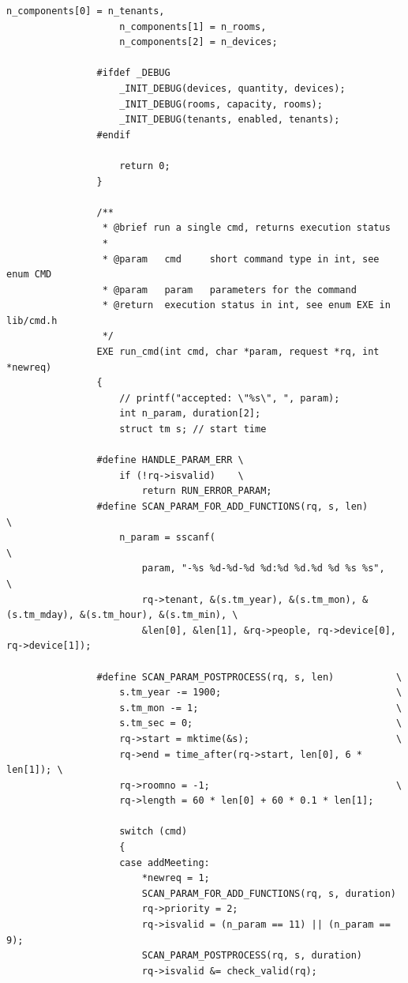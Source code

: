 \documentclass{article}
\begin{document}
\begin{Verbatim}[gobble=8]
                    n_components[0] = n_tenants,
                    n_components[1] = n_rooms,
                    n_components[2] = n_devices;
                
                #ifdef _DEBUG
                    _INIT_DEBUG(devices, quantity, devices);
                    _INIT_DEBUG(rooms, capacity, rooms);
                    _INIT_DEBUG(tenants, enabled, tenants);
                #endif
                
                    return 0;
                }
                
                /**
                 * @brief run a single cmd, returns execution status
                 * 
                 * @param   cmd     short command type in int, see enum CMD
                 * @param   param   parameters for the command
                 * @return  execution status in int, see enum EXE in lib/cmd.h
                 */
                EXE run_cmd(int cmd, char *param, request *rq, int *newreq)
                {
                    // printf("accepted: \"%s\", ", param);
                    int n_param, duration[2];
                    struct tm s; // start time
                
                #define HANDLE_PARAM_ERR \
                    if (!rq->isvalid)    \
                        return RUN_ERROR_PARAM;
                #define SCAN_PARAM_FOR_ADD_FUNCTIONS(rq, s, len)                                        \
                    n_param = sscanf(                                                                   \
                        param, "-%s %d-%d-%d %d:%d %d.%d %d %s %s",                                     \
                        rq->tenant, &(s.tm_year), &(s.tm_mon), &(s.tm_mday), &(s.tm_hour), &(s.tm_min), \
                        &len[0], &len[1], &rq->people, rq->device[0], rq->device[1]);
                
                #define SCAN_PARAM_POSTPROCESS(rq, s, len)           \
                    s.tm_year -= 1900;                               \
                    s.tm_mon -= 1;                                   \
                    s.tm_sec = 0;                                    \
                    rq->start = mktime(&s);                          \
                    rq->end = time_after(rq->start, len[0], 6 * len[1]); \
                    rq->roomno = -1;                                 \
                    rq->length = 60 * len[0] + 60 * 0.1 * len[1];
                
                    switch (cmd)
                    {
                    case addMeeting:
                        *newreq = 1;
                        SCAN_PARAM_FOR_ADD_FUNCTIONS(rq, s, duration)
                        rq->priority = 2;
                        rq->isvalid = (n_param == 11) || (n_param == 9);
                        SCAN_PARAM_POSTPROCESS(rq, s, duration)
                        rq->isvalid &= check_valid(rq);
                

\end{Verbatim}
\end{document}

